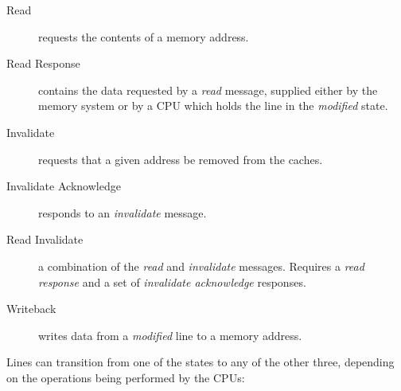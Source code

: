 \begin{description}
    \item[Read] requests the contents of a memory address.
    \item[Read Response]
        contains the data requested by a \emph{read} message, supplied either by
        the memory system or by a CPU which holds the line in the
        \emph{modified} state.
    \item[Invalidate] requests that a given address be removed from the caches.
    \item[Invalidate Acknowledge] responds to an \emph{invalidate} message.
    \item[Read Invalidate]
        a combination of the \emph{read} and \emph{invalidate} messages.
        Requires a \emph{read response} and a set of \emph{invalidate
        acknowledge} responses.
    \item[Writeback]
        writes data from a \emph{modified} line to a memory address.
\end{description}

Lines can transition from one of the states to any of the other three, depending
on the operations being performed by the CPUs:

